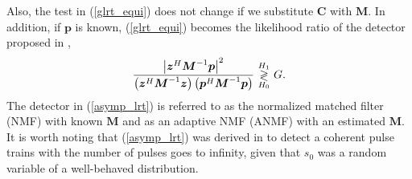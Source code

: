 Also, the test in (\ref{glrt_equi}) does not change if
we substitute $\boldsymbol{C}$ with $\boldsymbol{M}$.
In addition,
if $\boldsymbol{p}$ is known,
(\ref{glrt_equi}) becomes the likelihood ratio
of the detector proposed
in \cite{Conte95},
\begin{equation}\label{asymp_lrt}
\frac{\left |\boldsymbol{z}^H \boldsymbol{M}^{-1}\boldsymbol{p} \right |^2}
     { \left (\boldsymbol{z}^H \boldsymbol{M}^{-1} \boldsymbol{z} \right )
   \left (\boldsymbol{p}^H \boldsymbol{M}^{-1} \boldsymbol{p} \right )}
   \thinspace\mathop{\gtrless}_{H_0}^{H_1}\thinspace G.
\end{equation}
The detector in \cite{Conte95}
(\ref{asymp_lrt}) is referred to as the normalized matched filter (NMF)
with known $\boldsymbol{M}$
and as an adaptive NMF (ANMF) with an estimated $\boldsymbol{M}$.
It is worth noting that (\ref{asymp_lrt}) was derived in \cite{Conte95}
to detect a coherent pulse trains with 
the number of pulses goes to infinity, given that
$s_0$ was a
random variable of a well-behaved distribution.

